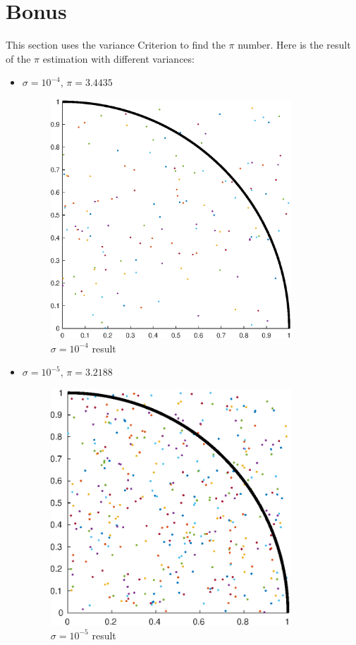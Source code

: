 \section{Bonus}
This section uses the variance Criterion to find the $\pi$ number. Here is the result of the $\pi$ estimation with different variances:
\newpage
\begin{itemize}
    \item $\sigma = 10^{-4}$, $\pi = 3.4435$
    \begin{figure}[H] 
     	\caption{$\sigma = 10^{-4}$ result} 
     	\centering 
     	\includegraphics[width=9cm]{../Figure/Bonus/mont_e4} 
    \end{figure}
    \item $\sigma = 10^{-5}$, $\pi = 3.2188$
    \begin{figure}[H] 
        \caption{$\sigma = 10^{-5}$ result} 
        \centering 
        \includegraphics[width=9cm]{../Figure/Bonus/mont1e-05.eps} 

\end{figure}
\end{itemize}
